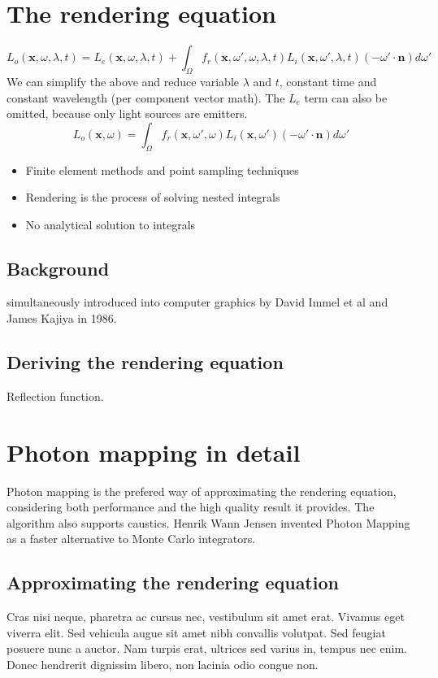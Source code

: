\section{The rendering equation}
\[
L_o(\mathbf x, \omega, \lambda, t) = L_e(\mathbf x, \omega, \lambda, t) + \int_\Omega f_r(\mathbf x, \omega', \omega, \lambda, t) L_i(\mathbf x, \omega', \lambda, t) (-\omega' \cdot \mathbf n) d \omega'
\]
We can simplify the above and reduce variable $\lambda$ and $t$, constant time and constant wavelength (per component vector math). The $L_e$ term can also be omitted, because only light sources are emitters.
\[
L_o(\mathbf x, \omega) = \int_\Omega f_r(\mathbf x, \omega', \omega) L_i(\mathbf x, \omega') (-\omega' \cdot \mathbf n) d \omega'
\]

\begin{itemize}
\item Finite element methods and point sampling techniques
\item Rendering is the process of solving nested integrals
\item No analytical solution to integrals
\end{itemize}
\subsection{Background}
simultaneously introduced into computer graphics by David Immel et al and James Kajiya in 1986.
\subsection{Deriving the rendering equation}
Reflection function.
\section{Photon mapping in detail}
Photon mapping is the prefered way of approximating the rendering equation, considering both performance and the high quality result it provides.
The algorithm also supports caustics. Henrik Wann Jensen invented Photon Mapping as a faster alternative to Monte Carlo integrators.
\subsection{Approximating the rendering equation}
Cras nisi neque, pharetra ac cursus nec, vestibulum sit amet erat. Vivamus eget viverra elit. Sed vehicula augue sit amet nibh convallis volutpat. Sed feugiat posuere nunc a auctor. Nam turpis erat, ultrices sed varius in, tempus nec enim. Donec hendrerit dignissim libero, non lacinia odio congue non. 
